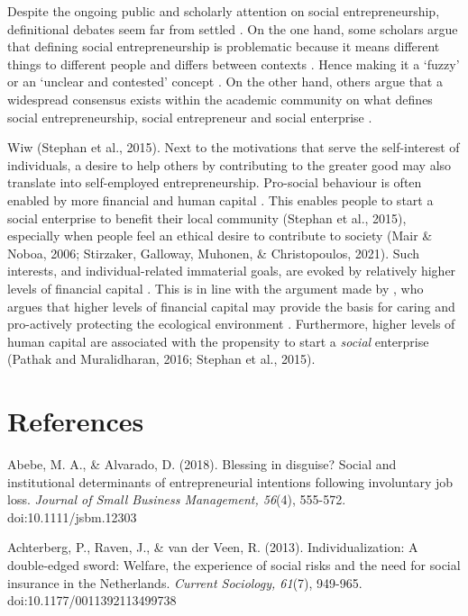 \documentclass{article}
\begin{document}
  Despite the ongoing public and scholarly attention on social entrepreneurship, definitional debates seem far from settled \parencite{Saebi2019}. On the one hand, some scholars argue that defining social entrepreneurship is problematic because it means different things to different people and differs between contexts \parencite{Mair2010}. Hence making it a ‘fuzzy' \parencite{Choi2014} or an ‘unclear and contested' concept \parencite{Saebi2019}. On the other hand, others argue that a widespread consensus exists within the academic community on what defines social entrepreneurship, social entrepreneur and social enterprise \parencite{Alegre2017}.



Wiw (Stephan et al., 2015). Next to the motivations that serve the self-interest of individuals, a desire to help others by contributing to the greater good may also translate into self-employed entrepreneurship. Pro-social behaviour is often enabled by more financial and human capital \parencite{Korndörfer2015}. This enables people to start a social enterprise to benefit their local community (Stephan et al., 2015), especially when people feel an ethical desire to contribute to society (Mair \& Noboa, 2006; Stirzaker, Galloway, Muhonen, \& Christopoulos, 2021). Such interests, and individual-related immaterial goals, are evoked by relatively higher levels of financial capital \parencite{Inglehart1977, Kraus2012}. This is in line with the argument made by \parencite{Inglehart1977}, who argues that higher levels of financial capital may provide the basis for caring and pro-actively protecting the ecological environment \parencite{Franzen2013}. Furthermore, higher levels of human capital are associated with the propensity to start a \emph{social }enterprise (Pathak and Muralidharan, 2016; Stephan et al., 2015). 



\section{References}



Abebe, M. A., \& Alvarado, D. (2018). Blessing in disguise? Social and institutional determinants of entrepreneurial intentions following involuntary job loss. \emph{Journal of Small Business Management, 56}(4), 555-572. doi:10.1111/jsbm.12303

Achterberg, P., Raven, J., \& van der Veen, R. (2013). Individualization: A double-edged sword: Welfare, the experience of social risks and the need for social insurance in the Netherlands. \emph{Current Sociology, 61}(7), 949-965. doi:10.1177/0011392113499738
\end{document}
